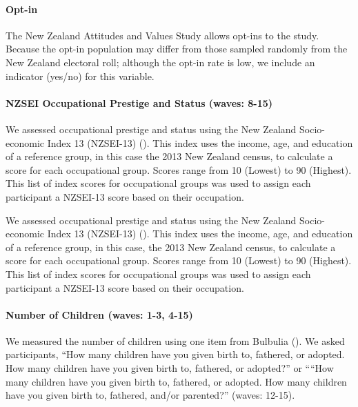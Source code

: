 \documentclass[
  singlecolumn]{article}
\let\oldparagraph\paragraph
\renewcommand{\paragraph}[1]{\oldparagraph{#1}\mbox{}}
\begin{document}
\paragraph{Opt-in}\label{opt-in}

The New Zealand Attitudes and Values Study allows opt-ins to the study.
Because the opt-in population may differ from those sampled randomly
from the New Zealand electoral roll; although the opt-in rate is low, we
include an indicator (yes/no) for this variable.

\paragraph{NZSEI Occupational Prestige and Status (waves:
8-15)}\label{nzsei-occupational-prestige-and-status-waves-8-15}

We assessed occupational prestige and status using the New Zealand
Socio-economic Index 13 (NZSEI-13) (). This index uses the income, age, and education of
a reference group, in this case the 2013 New Zealand census, to
calculate a score for each occupational group. Scores range from 10
(Lowest) to 90 (Highest). This list of index scores for occupational
groups was used to assign each participant a NZSEI-13 score based on
their occupation.

We assessed occupational prestige and status using the New Zealand
Socio-economic Index 13 (NZSEI-13) (). This index uses the income, age, and education of
a reference group, in this case, the 2013 New Zealand census, to
calculate a score for each occupational group. Scores range from 10
(Lowest) to 90 (Highest). This list of index scores for occupational
groups was used to assign each participant a NZSEI-13 score based on
their occupation.

\paragraph{Number of Children (waves: 1-3,
4-15)}\label{number-of-children-waves-1-3-4-15}

We measured the number of children using one item from Bulbulia
(). We asked participants, ``How many
children have you given birth to, fathered, or adopted. How many
children have you given birth to, fathered, or adopted?'' or ````How
many children have you given birth to, fathered, or adopted. How many
children have you given birth to, fathered, and/or parented?'' (waves:
12-15).
\end{document}
